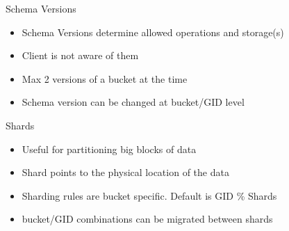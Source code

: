 \documentclass[aspectratio=169]{beamer}
\begin{document}
\begin{frame}{Schema Versions}
    \begin{itemize}
        \item Schema Versions determine allowed operations and storage(s)
        \item Client is not aware of them
        \item Max 2 versions of a bucket at the time
        \item Schema version can be changed at bucket/GID level
    \end{itemize}
\end{frame}

\begin{frame}{Shards}
    \begin{itemize}
        \item Useful for partitioning big blocks of data
        \item Shard points to the physical location of the data
        \item Sharding rules are bucket specific. Default is GID \% Shards
        \item bucket/GID combinations can be migrated between shards
    \end{itemize}
\end{frame}
\end{document}
